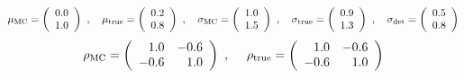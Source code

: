 \[
\mu_{\rm MC} = 
\left(
\begin{array}{r}
0.0 \\ 1.0 \\  
\end{array}
\right) \ ,
\ \ \
\mu_{\rm true} = 
\left(
\begin{array}{r}
0.2 \\ 0.8 \\ 
\end{array}
\right) \ ,
\ \ \
\sigma_{\rm MC} =
\left(
\begin{array}{r}
1.0 \\ 1.5 \\ 
\end{array}
\right) \ ,
\ \ \
\sigma_{\rm true} =
\left(
\begin{array}{r}
0.9 \\ 1.3 \\ 
\end{array}
\right) \ ,
\ \ \ 
\sigma_{\rm det} = 
\left(
\begin{array}{r}
0.5 \\ 0.8 \\ 
\end{array}
\right)
\]
%
\[
  \rho_{\rm MC} =
  \left(
  \begin{array}{rr}
    1.0 & -0.6   \\
    -0.6 & 1.0   \\
  \end{array}
  \right) \ ,
\ \ \ \
  \rho_{\rm true} =
  \left(
  \begin{array}{rr}
    1.0 & -0.6  \\
    -0.6 & 1.0   \\
  \end{array}
  \right)
\]


